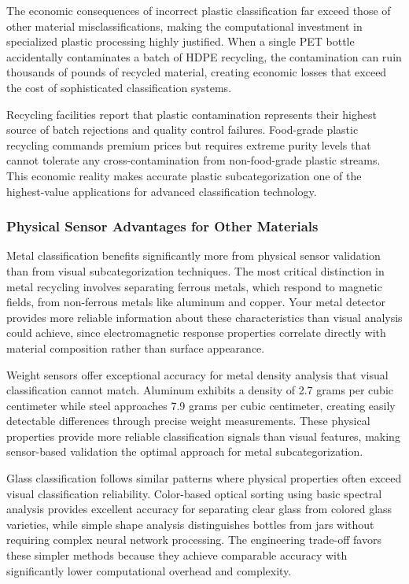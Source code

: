 \documentclass[11pt, a4paper]{article}
\begin{document}
The economic consequences of incorrect plastic classification far exceed those of other material misclassifications, making the computational investment in specialized plastic processing highly justified. When a single PET bottle accidentally contaminates a batch of HDPE recycling, the contamination can ruin thousands of pounds of recycled material, creating economic losses that exceed the cost of sophisticated classification systems.

Recycling facilities report that plastic contamination represents their highest source of batch rejections and quality control failures. Food-grade plastic recycling commands premium prices but requires extreme purity levels that cannot tolerate any cross-contamination from non-food-grade plastic streams. This economic reality makes accurate plastic subcategorization one of the highest-value applications for advanced classification technology.

\subsubsection{Physical Sensor Advantages for Other Materials}

Metal classification benefits significantly more from physical sensor validation than from visual subcategorization techniques. The most critical distinction in metal recycling involves separating ferrous metals, which respond to magnetic fields, from non-ferrous metals like aluminum and copper. Your metal detector provides more reliable information about these characteristics than visual analysis could achieve, since electromagnetic response properties correlate directly with material composition rather than surface appearance.

Weight sensors offer exceptional accuracy for metal density analysis that visual classification cannot match. Aluminum exhibits a density of 2.7 grams per cubic centimeter while steel approaches 7.9 grams per cubic centimeter, creating easily detectable differences through precise weight measurements. These physical properties provide more reliable classification signals than visual features, making sensor-based validation the optimal approach for metal subcategorization.

Glass classification follows similar patterns where physical properties often exceed visual classification reliability. Color-based optical sorting using basic spectral analysis provides excellent accuracy for separating clear glass from colored glass varieties, while simple shape analysis distinguishes bottles from jars without requiring complex neural network processing. The engineering trade-off favors these simpler methods because they achieve comparable accuracy with significantly lower computational overhead and complexity.
\end{document}
